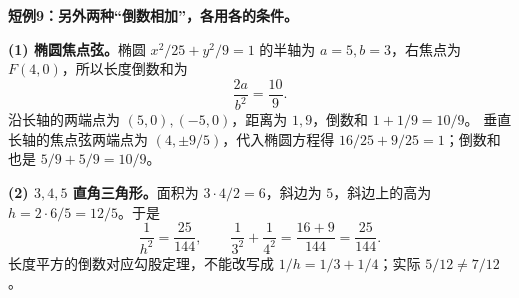 \clearpage
\begin{examplebox}
\textbf{短例9：另外两种“倒数相加”，各用各的条件。}

\textbf{(1) 椭圆焦点弦。}椭圆 $x^2/25+y^2/9=1$ 的半轴为 $a=5,b=3$，右焦点为 $F(4,0)$，所以长度倒数和为
\[
\boxed{\frac{2a}{b^2}=\frac{10}{9}}.
\]
沿长轴的两端点为 $(5,0),(-5,0)$，距离为 $1,9$，倒数和 $1+1/9=10/9$。
垂直长轴的焦点弦两端点为 $(4,\pm9/5)$，代入椭圆方程得 $16/25+9/25=1$；倒数和也是 $5/9+5/9=10/9$。

\medskip
\textbf{(2) $3,4,5$ 直角三角形。}面积为 $3\cdot4/2=6$，斜边为 $5$，斜边上的高为 $h=2\cdot6/5=12/5$。于是
\[
\frac1{h^2}=\frac{25}{144},\qquad
\frac1{3^2}+\frac1{4^2}=\frac{16+9}{144}=\frac{25}{144}.
\]
长度平方的倒数对应勾股定理，不能改写成 $1/h=1/3+1/4$；实际 $5/12\ne7/12$。
\end{examplebox}
